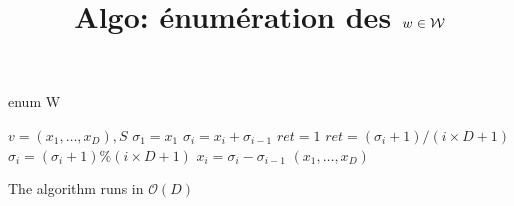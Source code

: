 \documentclass[10pt,a4paper]{article}
\title{Algo: énumération des $w\in\mathcal{W}$}
\begin{document}
\maketitle

\begin{algorithm}
  \caption{enum W}
  \begin{algorithmic}
    \REQUIRE $v=(x_1,\dots, x_D), S$
    \STATE $\sigma_1=x_1$
    \STATE $\sigma_i=x_i+\sigma_{i-1}$
    \ENDFOR
    \STATE
    \STATE $ret=1$ 
    \STATE $ret=(\sigma_i+1)/(i\times D+1)$
    \STATE $\sigma_i= (\sigma_i+1)\%(i\times D+1)$
    \ENDIF    
    \STATE $x_i=\sigma_i-\sigma_{i-1}$
    \ENDFOR
    \RETURN $(x_1,\dots,x_D)$
  \end{algorithmic}
\end{algorithm}

The algorithm runs in $\mathcal{O}(D)$
\end{document}
